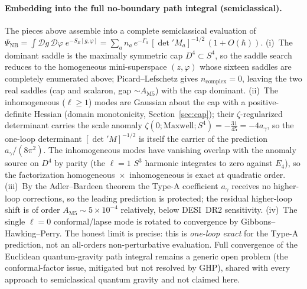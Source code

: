 \documentclass[11pt,a4paper]{article}
\theoremstyle{plain}
\theoremstyle{definition}
\theoremstyle{remark}
\newcommand{\ag}{a_\gamma}
\begin{document}
\paragraph{Embedding into the full no-boundary path integral (semiclassical).} The pieces above
assemble into a complete semiclassical evaluation of
$\Psi_{\mathrm{NB}} = \int\!\mathcal{D}g\,\mathcal{D}\varphi\;e^{-S_E[g,\varphi]}
= \sum_a n_a\, e^{-\Gamma_a}\,[\det{}' M_a]^{-1/2}\,(1+O(\hbar))$.
(i)~The dominant saddle is the maximally symmetric cap $D^4\subset S^4$, so the saddle search
reduces to the homogeneous mini-superspace $(z,\varphi)$ whose sixteen saddles are completely
enumerated above; Picard--Lefschetz gives $n_{\mathrm{complex}}=0$, leaving the two real saddles
(cap and scalaron, gap $\sim A_{\mathrm{M5}}$) with the cap dominant. (ii)~The inhomogeneous
($\ell\ge1$) modes are Gaussian about the cap with a positive-definite Hessian (domain
monotonicity, Section~\ref{sec:cap}); their $\zeta$-regularized determinant carries the scale
anomaly $\zeta(0;\text{Maxwell};S^4)=-\tfrac{31}{45}=-4\ag$, so the one-loop determinant
$[\det{}'M]^{-1/2}$ is itself the carrier of the prediction $\ag/(8\pi^2)$. The inhomogeneous
modes have vanishing overlap with the anomaly source on $D^4$ by parity (the $\ell=1$ $S^3$
harmonic integrates to zero against $E_4$), so the factorization homogeneous~$\times$~inhomogeneous
is exact at quadratic order. (iii)~By the Adler--Bardeen theorem the Type-A coefficient $\ag$
receives no higher-loop corrections, so the leading prediction is protected; the residual
higher-loop shift is of order $A_{\mathrm{M5}}\sim5\times10^{-4}$ relatively, below DESI~DR2
sensitivity. (iv)~The single $\ell=0$ conformal/lapse mode is rotated to convergence by
Gibbons--Hawking--Perry. The honest limit is precise: this is \emph{one-loop exact} for the
Type-A prediction, not an all-orders non-perturbative evaluation. Full convergence of the
Euclidean quantum-gravity path integral remains a generic open problem (the conformal-factor
issue, mitigated but not resolved by GHP), shared with every approach to semiclassical quantum
gravity and not claimed here.
\end{document}
